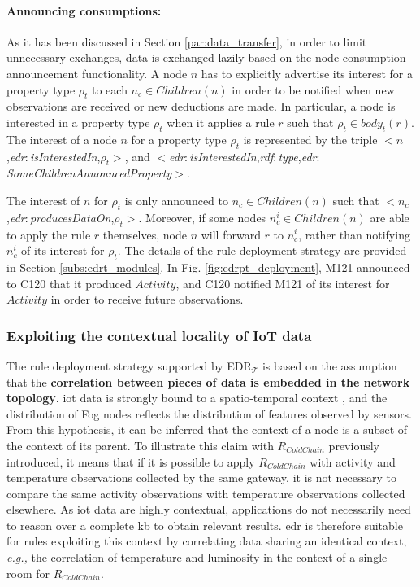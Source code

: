 \documentclass[sw]{iosart2x}
\newcommand{\edrt}{EDR$_{\mathcal{T}}$\xspace}
\newcommand{\namespace}[1]{\textit{#1$:$}}
\newcommand{\concept}[2]{\namespace{#1}\-\textit{#2}}
\newcommand{\triplet}[3]{$<$#1,\textit{#2},#3$>$}
\begin{document}
\paragraph{Announcing consumptions:}
As it has been discussed in Section \textsection \ref{par:data_transfer}, in order to limit unnecessary exchanges, data is exchanged lazily based on the node consumption announcement functionality.
A node $n$ has to explicitly advertise its interest for a property type $\rho_{t}$ to each $n_c\in Children(n)$ in order to be notified when new observations are received or new deductions are made. 
In particular, a node is interested in a property type $\rho_{t}$ when it applies a rule $r$ such that $\rho_{t}\in body_t(r)$. 
The interest of a node $n$ for a property type $\rho_t$ is represented by the triple \triplet{$n$}{\concept{edr}{is\-Interested\-In}}{$\rho_t$}, and \triplet{\concept{edr}{is\-Interested\-In}}{\concept{rdf}{type}}{\concept{edr}{Some\-Children\-Announced\-Property}}.

The interest of $n$ for $\rho_t$ is only announced to $n_c\in Children(n)$ such that \triplet{$n_c$}{\concept{edr}{produces\-Data\-On}}{$\rho_t$}.
Moreover, if some nodes $n^i_{c}\in Children(n)$ are able to apply the rule $r$ themselves, node $n$ will forward $r$ to $n^i_{c}$, rather than notifying $n^i_{c}$ of its interest for $\rho_t$.
The details of the rule deployment strategy are provided in Section \textsection \ref{subs:edrt_modules}.
In Fig. \ref{fig:edrpt_deployment}, M121 announced to C120 that it produced $Activity$, and C120 notified M121 of its interest for $Activity$ in order to receive future observations.

\subsubsection{Exploiting the contextual locality of IoT data}
\label{subsubs:topology_rules}

The rule deployment strategy supported by \edrt is based on the assumption that the \textbf{correlation between pieces of data is embedded in the network topology}. 
\gls{iot} data is strongly bound to a spatio-temporal context \cite{Perera2014_context}, and the distribution of Fog nodes reflects the distribution of features observed by sensors.
From this hypothesis, it can be inferred that the context of a node is a subset of the context of its parent.
To illustrate this claim with $R_{ColdChain}$ previously introduced, it means that if it is possible to apply $R_{ColdChain}$ with activity and temperature observations collected by the same gateway, it is not necessary to compare the same activity observations with temperature observations collected elsewhere.
As \gls{iot} data are highly contextual, applications do not necessarily need to reason over a complete \gls{kb} to obtain relevant results.
\gls{edr} is therefore suitable for rules exploiting this context by correlating data sharing an identical context, \textit{e.g.,} the correlation of temperature and luminosity in the context of a single room for $R_{ColdChain}$.
\end{document}
